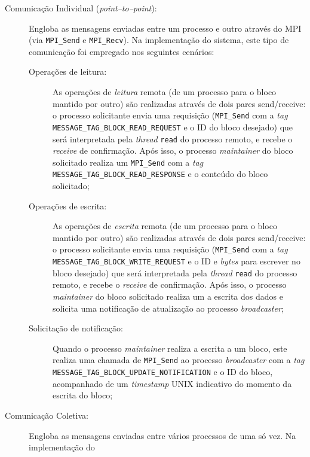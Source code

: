 \documentclass[12pt]{article}
\begin{document}
\begin{description}
  \item[Comunicação Individual (\textit{point--to--point}):] Engloba as mensagens enviadas entre um processo e outro
    através do MPI (via \texttt{MPI\_Send} e \texttt{MPI\_Recv}). Na implementação do sistema, este tipo de comunicação
    foi empregado nos seguintes cenários:
    \begin{description}
      \item[Operações de leitura:] As operações de \textit{leitura} remota (de um processo para o bloco mantido por
        outro) são realizadas através de dois pares send/receive: o processo solicitante envia uma requisição
        (\texttt{MPI\_Send} com a \textit{tag} \texttt{MESSAGE\_TAG\_BLOCK\_READ\_REQUEST} e o ID do bloco desejado) que
        será interpretada pela \textit{thread} \texttt{read} do processo remoto, e recebe o
        \textit{receive} de confirmação. Após isso, o processo \textit{maintainer} do bloco solicitado realiza um
        \texttt{MPI\_Send} com a \textit{tag} \\ \texttt{MESSAGE\_TAG\_BLOCK\_READ\_RESPONSE} e o conteúdo do bloco solicitado;
      \item[Operações de escrita:] As operações de \textit{escrita} remota (de um processo para o bloco mantido por
        outro) são realizadas através de dois pares send/receive: o processo solicitante envia uma requisição
        (\texttt{MPI\_Send} com a \textit{tag} \\ \texttt{MESSAGE\_TAG\_BLOCK\_WRITE\_REQUEST} e o ID e \textit{bytes} para
        escrever no bloco desejado) que será interpretada pela \textit{thread} \texttt{read} do processo remoto, e recebe
        o \textit{receive} de confirmação. Após isso, o processo \textit{maintainer} do bloco solicitado realiza um a 
        escrita dos dados e solicita uma notificação de atualização ao processo \textit{broadcaster};
      \item[Solicitação de notificação:] Quando o processo \textit{maintainer} realiza a escrita a um bloco, este
        realiza uma chamada de \texttt{MPI\_Send} ao processo \textit{broadcaster} com a \textit{tag}
        \texttt{MESSAGE\_TAG\_BLOCK\_UPDATE\_NOTIFICATION} e o ID do bloco, acompanhado de um \textit{timestamp} UNIX
        indicativo do momento da escrita do bloco;
    \end{description}
  \item[Comunicação Coletiva:] Engloba as mensagens enviadas entre vários processos de uma só vez. Na implementação do

\end{description}
\end{document}

